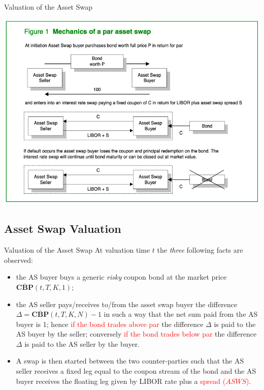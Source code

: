 \documentclass{beamer}
\begin{document}
\begin{frame}{Valuation of the Asset Swap}
	\begin{center}
		\includegraphics[width=0.7\linewidth]{asset_swap}
	\end{center}
\end{frame}

\subsection{Asset Swap Valuation}
\begin{frame}{Valuation of the Asset Swap}
	At valuation time $t$ the \emph{three} following facts are observed:
	\begin{itemize}
		\item<2-> the AS buyer buys a generic \emph{risky} coupon bond at the market price $\overline{\textbf{CBP}}(t,T,K,1)$;
		\item<3-> the AS seller pays/receives to/from the asset swap buyer the difference $\Delta = \overline{\textbf{CBP}}(t,T,K,N)-1$ in such a way that the net sum paid from the AS buyer is 1; hence \textcolor{red}{if the bond trades above par} the difference $\Delta$ is paid to the AS buyer by the seller; conversely \textcolor{red}{if the bond trades below par} the difference $\Delta$ is paid to the AS seller by the buyer.
		\item<4-> A swap is then started between the two counter-parties such that the AS seller receives a fixed leg equal to the coupon stream of the bond and the AS buyer receives the floating leg given by LIBOR rate plus a \textcolor{red}{spread ($ASWS$)}.
	\end{itemize}
\end{frame}
\end{document}
